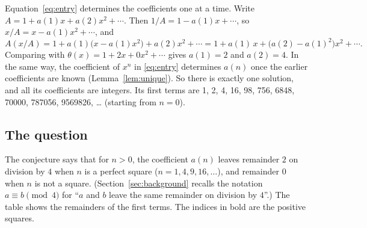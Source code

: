 \documentclass[11pt,a4paper]{article}
\theoremstyle{definition}
\theoremstyle{remark}
\begin{document}
Equation~\eqref{eq:entry} determines the coefficients one at a time. Write $A=1+a(1)x+a(2)x^2+\cdots$. Then
$1/A=1-a(1)x+\cdots$, so $x/A=x-a(1)x^2+\cdots$, and
\[
A(x/A)=1+a(1)\bigl(x-a(1)x^2\bigr)+a(2)x^2+\cdots=1+a(1)\,x+\bigl(a(2)-a(1)^2\bigr)x^2+\cdots .
\]
Comparing with $\theta(x)=1+2x+0x^2+\cdots$ gives $a(1)=2$ and $a(2)=4$. In the same way, the coefficient
of $x^n$ in \eqref{eq:entry} determines $a(n)$ once the earlier coefficients are known (Lemma~\ref{lem:unique}). So
there is exactly one solution, and all its coefficients are integers. Its first terms are
1, 2, 4, 16, 98, 756, 6848, 70000, 787056, 9569826, \dots{} (starting from $n=0$).

\subsection{The question}
The conjecture says that for $n>0$, the coefficient $a(n)$ leaves remainder $2$ on division by $4$ when $n$ is a
perfect square ($n=1,4,9,16,\dots$), and remainder $0$ when $n$ is not a square. (Section~\ref{sec:background} recalls
the notation $a\equiv b\pmod 4$ for ``$a$ and $b$ leave the same remainder on division by $4$''.) The table shows the
remainders of the first terms. The indices in bold are the positive squares.
\end{document}
